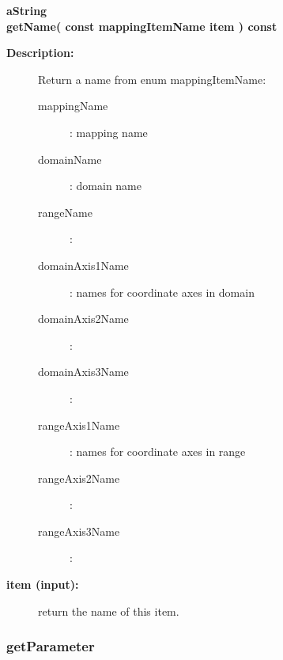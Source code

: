 \begin{flushleft} \textbf{%
aString  \\ 
\settowidth{\MappingIncludeArgIndent}{getName(}%
getName( const mappingItemName item ) const
}\end{flushleft}
\begin{description}
\item[{\bf Description:}] 
    Return a name from enum mappingItemName:
  \begin{description}
    \item[mappingName] : mapping name
    \item[domainName] : domain name
    \item[rangeName] :
    \item[domainAxis1Name] : names for coordinate axes in domain
    \item[domainAxis2Name] : 
    \item[domainAxis3Name] : 
    \item[rangeAxis1Name] : names for coordinate axes in range
    \item[rangeAxis2Name] : 
    \item[rangeAxis3Name] :
  \end{description}
\item[{\bf item (input):}]  return the name of this item.
\end{description}
\subsubsection{getParameter}
 
